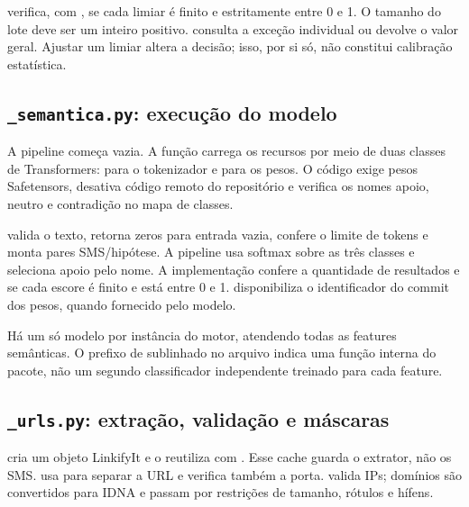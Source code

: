 verifica, com , se cada limiar é finito e estritamente entre 0 e 1. O tamanho do lote deve ser um inteiro positivo.  consulta a exceção individual ou devolve o valor geral. Ajustar um limiar altera a decisão; isso, por si só, não constitui calibração estatística.

\clearpage
\subsection{\texttt{\_\allowbreak{}semantica.py}: execução do modelo}
A pipeline começa vazia. A função  carrega os recursos por meio de duas classes de Transformers:  para o tokenizador e  para os pesos. O código exige pesos Safetensors, desativa código remoto do repositório e verifica os nomes apoio, neutro e contradição no mapa de classes.

 valida o texto, retorna zeros para entrada vazia, confere o limite de tokens e monta pares SMS/hipótese. A pipeline usa softmax sobre as três classes e seleciona apoio pelo nome. A implementação confere a quantidade de resultados e se cada escore é finito e está entre 0 e 1.  disponibiliza o identificador do commit dos pesos, quando fornecido pelo modelo.

\begin{caixainfo}
Há um só modelo por instância do motor, atendendo todas as features semânticas. O prefixo de sublinhado no arquivo indica uma função interna do pacote, não um segundo classificador independente treinado para cada feature.
\end{caixainfo}

\subsection{\texttt{\_\allowbreak{}urls.py}: extração, validação e máscaras}
 cria um objeto LinkifyIt e o reutiliza com . Esse cache guarda o extrator, não os SMS.  usa  para separar a URL e verifica também a porta.  valida IPs; domínios são convertidos para IDNA e passam por restrições de tamanho, rótulos e hífens.

